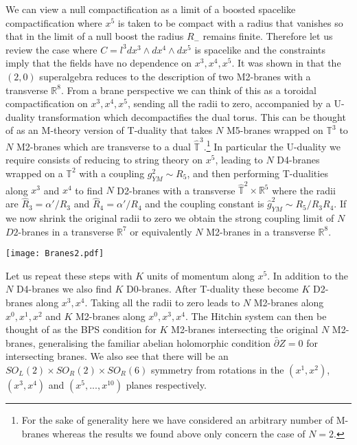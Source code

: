\documentclass[12pt]{article}
\numberwithin{equation}{section}
\begin{document}
We can view  a null compactification as a limit of a boosted spacelike compactification where $x^5$ is taken to be compact with a radius that vanishes so that in the limit of a null boost the radius $R_-$ remains finite.
Therefore let us review the case where $C =l^3 dx^3\wedge dx^4\wedge dx^5$ is spacelike and the constraints imply that the fields have no dependence on $x^3,x^4,x^5$. It was shown in  \cite{Lambert:2016xbs} that the  $(2,0)$ superalgebra reduces to the description of two M2-branes with a transverse ${\mathbb R}^8$.  From a brane perspective we can think of this as a toroidal compactification on $x^3,x^4,x^5$, sending all the radii to zero,  accompanied by a U-duality transformation which decompactifies the dual torus. This can be thought of as an M-theory version of T-duality that takes $N$ M5-branes wrapped on ${\mathbb T}^3$ to $N$ M2-branes which are transverse to a dual $\hat {\mathbb T}^3$.\footnote{For the sake of generality here we have considered an arbitrary number of M-branes whereas the results we found above only concern the case of $N=2$.} In particular the U-duality  we require consists of reducing to string theory on $x^5$, leading to $N$ D4-branes wrapped on a $ {\mathbb T}^2$ with a coupling $g^2_{YM}\sim R_5$, and then performing T-dualities along $x^3$ and $x^4$ 
to find $N$ D2-branes with a transverse $\hat {\mathbb T}^2\times {\mathbb R}^5$ where the radii are $\hat R_3 =\alpha'/R_3$ and $\hat R_4 =\alpha'/R_4$ and  the coupling constant is  $\hat g^2_{YM} \sim R_5/R_3R_4$. If we now shrink the original radii to zero we obtain the strong coupling limit of $N$ $D2$-branes in a transverse ${\mathbb R}^7$ or equivalently  $N$ M2-branes in a transverse ${\mathbb R}^8$.


\hskip-1cm\texttt{[image: Branes2.pdf]} 
\vskip-4cm 

Let us repeat these steps with $K$ units of momentum along $x^5$. In addition to the $N$ D4-branes we also find $K$ D0-branes. After T-duality these become $K$ D2-branes along $x^3,x^4$. Taking all the radii to zero leads to $N$ M2-branes along $x^0,x^1,x^2$ and $K$ M2-branes along $x^0,x^3,x^4$. The Hitchin system can then be thought of as the BPS condition for $K$ M2-branes intersecting the original $N$ M2-branes, generalising the familiar abelian holomorphic condition $\bar \partial Z=0$ for intersecting branes. We also see that there will be an $SO_L(2)\times SO_R(2)\times SO_R(6)$ symmetry from rotations in the $(x^1,x^2)$, $(x^3,x^4)$ and $(x^5,...,x^{10})$ planes respectively. 
\end{document}
